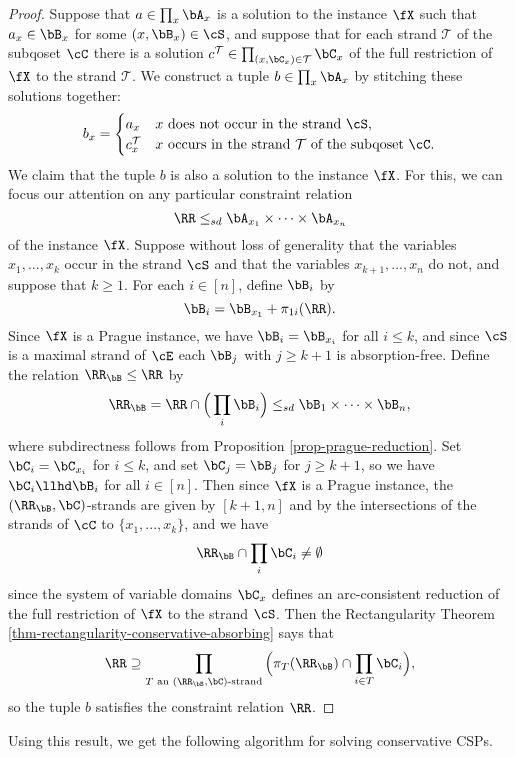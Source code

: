 \begin{proof} Suppose that $a \in \prod_x \bA_x$ is a solution to the instance $\fX$ such that $a_x \in \bB_x$ for some $(x,\bB_x) \in \cS$, and suppose that for each strand $\mathcal{T}$ of the subqoset $\cC$ there is a solution $c^\mathcal{T} \in \prod_{(x,\bC_x) \in \mathcal{T}} \bC_x$ of the full restriction of $\fX$ to the strand $\mathcal{T}$. We construct a tuple $b \in \prod_x \bA_x$ by stitching these solutions together:
\[
b_x = \begin{cases} a_x & x\text{ does not occur in the strand }\cS,\\ c^{\mathcal{T}}_x & x\text{ occurs in the strand }\mathcal{T}\text{ of the subqoset }\cC.\end{cases}
\]
We claim that the tuple $b$ is also a solution to the instance $\fX$. For this, we can focus our attention on any particular constraint relation
\[
\RR \le_{sd} \bA_{x_1} \times \cdots \times \bA_{x_n}
\]
of the instance $\fX$. Suppose without loss of generality that the variables $x_1, ..., x_k$ occur in the strand $\cS$ and that the variables $x_{k+1}, ..., x_n$ do not, and suppose that $k \ge 1$. For each $i \in [n]$, define $\bB_i$ by
\[
\bB_i = \bB_{x_1} + \pi_{1i}(\RR).
\]
Since $\fX$ is a Prague instance, we have $\bB_i = \bB_{x_i}$ for all $i \le k$, and since $\cS$ is a maximal strand of $\cE$ each $\bB_j$ with $j \ge k+1$ is absorption-free. Define the relation $\RR_\bB \le \RR$ by
\[
\RR_\bB = \RR \cap \Big(\prod_i \bB_i\Big) \le_{sd} \bB_1 \times \cdots \times \bB_n,
\]
where subdirectness follows from Proposition \ref{prop-prague-reduction}. Set $\bC_i = \bC_{x_i}$ for $i \le k$, and set $\bC_j = \bB_j$ for $j \ge k+1$, so we have $\bC_i \llhd \bB_i$ for all $i \in [n]$. Then since $\fX$ is a Prague instance, the $(\RR_\bB, \bC)$-strands are given by $[k+1,n]$ and by the intersections of the strands of $\cC$ to $\{x_1, ..., x_k\}$, and we have
\[
\RR_\bB \cap \prod_i \bC_i \ne \emptyset
\]
since the system of variable domains $\bC_x$ defines an arc-consistent reduction of the full restriction of $\fX$ to the strand $\cS$. Then the Rectangularity Theorem \ref{thm-rectangularity-conservative-absorbing} says that
\[
\RR \supseteq \prod_{T\text{ an }(\RR_\bB,\bC)\text{-strand}} \Big(\pi_T(\RR_\bB) \cap \prod_{i\in T}\bC_i\Big),
\]
so the tuple $b$ satisfies the constraint relation $\RR$.
\end{proof}

Using this result, we get the following algorithm for solving conservative CSPs.

